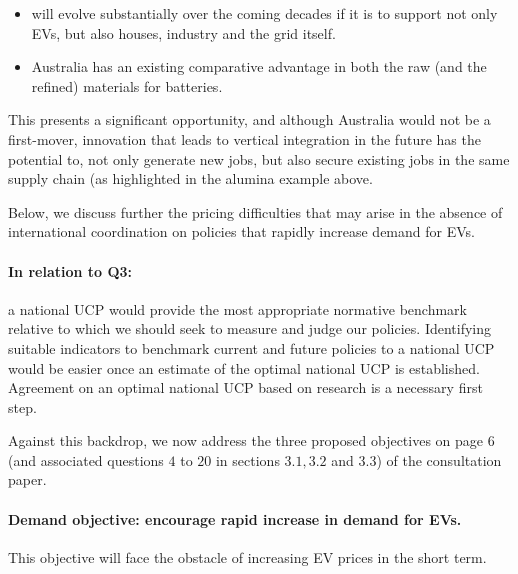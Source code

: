 \documentclass[12pt, draft]{article} \usepackage[shortlabels]{enumitem}
\begin{document}
\begin{itemize}
 
  \item will evolve substantially over the coming decades if it is to support
    not only EVs, but also houses, industry and the grid itself. 
 
  \item Australia has an existing comparative advantage in both the raw (and
    the refined) materials for batteries.

\end{itemize} 
   
This presents a significant opportunity, and although Australia would not
be a first-mover, innovation that leads to vertical integration in the
future has the potential to, not only generate new jobs, but also secure
existing jobs in the same supply chain (as highlighted in the alumina
example above.

Below, we discuss further the pricing
difficulties that may arise in the absence of international coordination on
policies that rapidly increase demand for EVs.

\paragraph{In relation to Q3:} a national UCP would provide the most
appropriate normative benchmark relative to which we should seek to measure and
judge our policies. Identifying suitable indicators to benchmark current and
future policies to a national UCP would be easier once an estimate of the
optimal national UCP is established. Agreement on an optimal national UCP based
on research is a necessary first step.

\vskip20pt

Against this backdrop, we now address the three proposed objectives on page 6
(and associated questions $4$ to $20$ in sections $3.1, 3.2$ and $3.3$) of
the consultation paper.

\paragraph{Demand objective: encourage rapid increase in demand for EVs.}
This objective will face the obstacle of increasing EV prices in the short
term.
\end{document}
